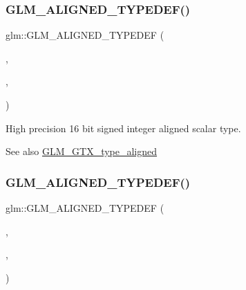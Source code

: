 \subsubsection{\texorpdfstring{G\+L\+M\+\_\+\+A\+L\+I\+G\+N\+E\+D\+\_\+\+T\+Y\+P\+E\+D\+E\+F()}{GLM\_ALIGNED\_TYPEDEF()}\hspace{0.1cm}{\footnotesize\ttfamily [34/209]}}
{\footnotesize\ttfamily glm\+::\+G\+L\+M\+\_\+\+A\+L\+I\+G\+N\+E\+D\+\_\+\+T\+Y\+P\+E\+D\+EF (\begin{DoxyParamCaption}\item[{\hyperlink{group__gtc__type__precision_gaa04399853952dbce29cb62e2432f350a}{highp\+\_\+i16}}]{,  }\item[{aligned\+\_\+highp\+\_\+i16}]{,  }\item[{2}]{ }\end{DoxyParamCaption})}

High precision 16 bit signed integer aligned scalar type. \begin{DoxySeeAlso}{See also}
\hyperlink{group__gtx__type__aligned}{G\+L\+M\+\_\+\+G\+T\+X\+\_\+type\+\_\+aligned} 
\end{DoxySeeAlso}
\mbox{\label{group__gtx__type__aligned_ga9c8172b745ee03fc5b2b91c350c2922f}} 
\subsubsection{\texorpdfstring{G\+L\+M\+\_\+\+A\+L\+I\+G\+N\+E\+D\+\_\+\+T\+Y\+P\+E\+D\+E\+F()}{GLM\_ALIGNED\_TYPEDEF()}\hspace{0.1cm}{\footnotesize\ttfamily [35/209]}}
{\footnotesize\ttfamily glm\+::\+G\+L\+M\+\_\+\+A\+L\+I\+G\+N\+E\+D\+\_\+\+T\+Y\+P\+E\+D\+EF (\begin{DoxyParamCaption}\item[{\hyperlink{group__gtc__type__precision_ga197d19b585222da57d70238a5cfc2be8}{highp\+\_\+i32}}]{,  }\item[{aligned\+\_\+highp\+\_\+i32}]{,  }\item[{4}]{ }\end{DoxyParamCaption})}

